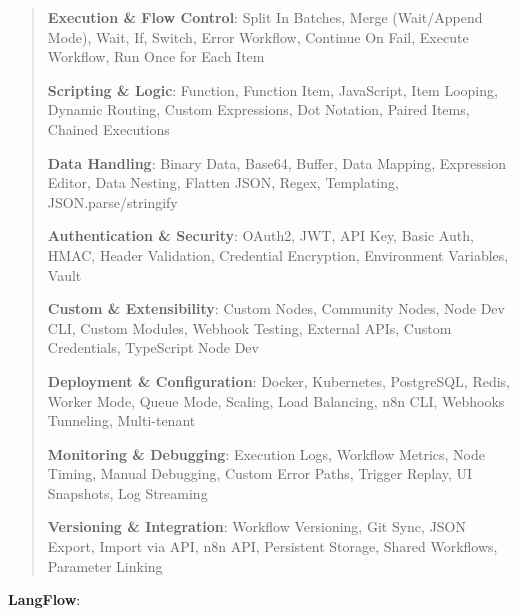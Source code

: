 \documentclass[a4paper]{article}
\begin{document}
\begin{quote}
\textbf{Execution \& Flow Control}: Split In Batches, Merge (Wait/Append
Mode), Wait, If, Switch, Error Workflow, Continue On Fail, Execute
Workflow, Run Once for Each Item

\textbf{Scripting \& Logic}: Function, Function Item, JavaScript, Item
Looping, Dynamic Routing, Custom Expressions, Dot Notation, Paired
Items, Chained Executions

\textbf{Data Handling}: Binary Data, Base64, Buffer, Data Mapping,
Expression Editor, Data Nesting, Flatten JSON, Regex, Templating,
JSON.parse/stringify

\textbf{Authentication \& Security}: OAuth2, JWT, API Key, Basic Auth,
HMAC, Header Validation, Credential Encryption, Environment Variables,
Vault

\textbf{Custom \& Extensibility}: Custom Nodes, Community Nodes, Node
Dev CLI, Custom Modules, Webhook Testing, External APIs, Custom
Credentials, TypeScript Node Dev

\textbf{Deployment \& Configuration}: Docker, Kubernetes, PostgreSQL,
Redis, Worker Mode, Queue Mode, Scaling, Load Balancing, n8n CLI,
Webhooks Tunneling, Multi-tenant

\textbf{Monitoring \& Debugging}: Execution Logs, Workflow Metrics, Node
Timing, Manual Debugging, Custom Error Paths, Trigger Replay, UI
Snapshots, Log Streaming

\textbf{Versioning \& Integration}: Workflow Versioning, Git Sync, JSON
Export, Import via API, n8n API, Persistent Storage, Shared Workflows,
Parameter Linking
\end{quote}

\textbf{LangFlow}:
\end{document}
